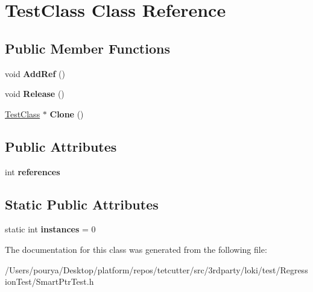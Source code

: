 \hypertarget{classTestClass}{}\section{Test\+Class Class Reference}
\label{classTestClass}
\subsection*{Public Member Functions}
\begin{DoxyCompactItemize}
\item 
\hypertarget{classTestClass_aaa7f9549ed96d4637f947b2423dc1e5b}{}void {\bfseries Add\+Ref} ()\label{classTestClass_aaa7f9549ed96d4637f947b2423dc1e5b}

\item 
\hypertarget{classTestClass_ae16e31fa13d56a7d8e4da90e1657187d}{}void {\bfseries Release} ()\label{classTestClass_ae16e31fa13d56a7d8e4da90e1657187d}

\item 
\hypertarget{classTestClass_acb030744a393c398af2639ca2e67de23}{}\hyperlink{classTestClass}{Test\+Class} $\ast$ {\bfseries Clone} ()\label{classTestClass_acb030744a393c398af2639ca2e67de23}

\end{DoxyCompactItemize}
\subsection*{Public Attributes}
\begin{DoxyCompactItemize}
\item 
\hypertarget{classTestClass_a5744bc5a1b0520038dc44ec5300ebf47}{}int {\bfseries references}\label{classTestClass_a5744bc5a1b0520038dc44ec5300ebf47}

\end{DoxyCompactItemize}
\subsection*{Static Public Attributes}
\begin{DoxyCompactItemize}
\item 
\hypertarget{classTestClass_a8059a1cbe01b0fb659fa93f7e5c8efc0}{}static int {\bfseries instances} = 0\label{classTestClass_a8059a1cbe01b0fb659fa93f7e5c8efc0}

\end{DoxyCompactItemize}


The documentation for this class was generated from the following file\+:\begin{DoxyCompactItemize}
\item 
/\+Users/pourya/\+Desktop/platform/repos/tetcutter/src/3rdparty/loki/test/\+Regression\+Test/Smart\+Ptr\+Test.\+h\end{DoxyCompactItemize}
